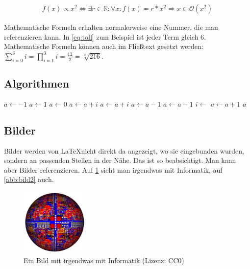 \documentclass[a4paper,10pt,ngerman]{scrartcl}
\begin{document}
\begin{align*}
 f(x) \propto  x^2 \Leftrightarrow \exists r \in \mathbb R : \forall x: f(x) = r * x^2 \Rightarrow x \in \mathcal{O}(x^2)
\end{align*}

Mathematische Formeln erhalten normalerweise eine Nummer, die man referenzieren kann.
In \cref{eq:toll} zum Beispiel ist jeder Term gleich $6$.
Mathematische Formeln können auch im Fließtext gesetzt werden: $\sum_{i=0}^3 i = \prod_{i=1}^3 i = \frac{12}{2} = \sqrt[3]{216}.$

\subsection{Algorithmen}
\begin{algorithmic}
  \State $a\gets -1$
  \State $a\gets 1$
\Else
  \State $a\gets 0$
\EndIf
{}
  \State $a\gets a + i$
\EndFor
{}
  \State $a\gets a + i$
\EndFor
{}
  \State $a\gets a - 1$
\EndWhile
\Repeat
  \State $a\gets a - 1$
\Loop
  \State $i\gets$
\EndLoop
{}
  \State $a \gets a+1$
  \State \Return $a$
\EndFunction
\end{algorithmic}

\subsection{Bilder}

Bilder werden von \LaTeX nicht direkt da angezeigt, wo sie eingebunden wurden, sondern an passenden Stellen in der Nähe.
Das ist so beabsichtigt.
Man kann aber Bilder referenzieren.
Auf \cref{abb:bild1} sieht man irgendwas mit Informatik, auf \cref{abb:bild2} auch.

\begin{figure}
	\begin{center}
		\includegraphics[width=0.3\textwidth]{computerbild1.png}
		\caption{Ein Bild mit irgendwas mit Informatik (Lizenz: CC0)}
		\label{abb:bild1}
	\end{center}
\end{figure}
\end{document}
